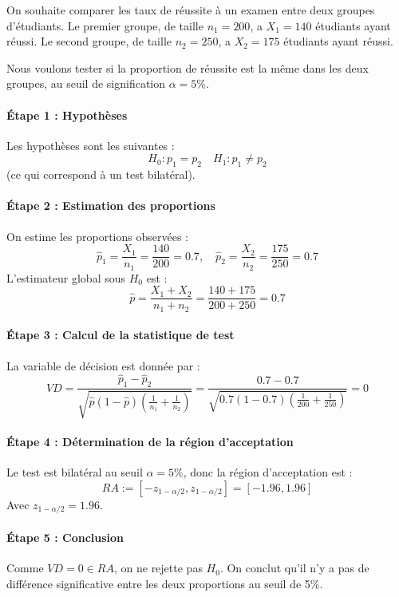 \begin{example}
    On souhaite comparer les taux de réussite à un examen entre deux groupes d'étudiants.
    Le premier groupe, de taille $n_1 = 200$, a $X_1 = 140$ étudiants ayant réussi.
    Le second groupe, de taille $n_2 = 250$, a $X_2 = 175$ étudiants ayant réussi.

    Nous voulons tester si la proportion de réussite est la même dans les deux groupes, 
    au seuil de signification $\alpha = 5\%$.

    \paragraph{Étape 1 : Hypothèses}  
    Les hypothèses sont les suivantes : 
        \[ H_0 : p_1 = p_2 \quad H_1 : p_1 \neq p_2 \]
    (ce qui correspond à un test bilatéral).

    \paragraph{Étape 2 : Estimation des proportions}  
    On estime les proportions observées :
        \[
            \hat{p}_1 = \frac{X_1}{n_1} = \frac{140}{200} = 0.7, \quad
            \hat{p}_2 = \frac{X_2}{n_2} = \frac{175}{250} = 0.7
        \]
    L'estimateur global sous $H_0$ est :
        \[
            \hat{p} = \frac{X_1 + X_2}{n_1 + n_2} = \frac{140 + 175}{200 + 250} = 0.7
        \]

    \paragraph{Étape 3 : Calcul de la statistique de test}  
    La variable de décision est donnée par :
        \[
            VD = \frac{\hat{p}_1 - \hat{p}_2}{\sqrt{\hat{p}(1-\hat{p}) \left( \frac{1}{n_1} + \frac{1}{n_2} \right)}}
            = \frac{0.7 - 0.7} {\sqrt{0.7(1-0.7) \left( \frac{1}{200} + \frac{1}{250} \right)}}
            = 0 
        \]

    \paragraph{Étape 4 : Détermination de la région d'acceptation}  
    Le test est bilatéral au seuil $\alpha = 5\%$, donc la région d'acceptation est :
        \[
            RA := \left[ -z_{1-\alpha/2}, z_{1-\alpha/2} \right] = [-1.96, 1.96]
        \]
    Avec $z_{1-\alpha/2} = 1.96$.

    \paragraph{Étape 5 : Conclusion}  
    Comme $VD = 0 \in RA$, on ne rejette pas $H_0$.
    On conclut qu'il n'y a pas de différence significative entre les deux proportions 
    au seuil de 5\%.

\end{example}



